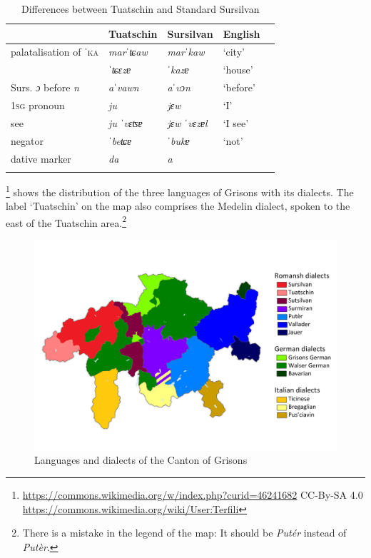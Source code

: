 \begin{table}
	\caption{Differences between Tuatschin and Standard Sursilvan}
	\label{difstand}
	\begin{tabular}{lllll}
		\lsptoprule
		& Tuatschin &  Sursilvan & English\\
		\midrule
	palatalisation of ˈ\textsc{ka}  & \textit{marˈʨaw} & \textit{marˈkaw} & `city'\\
	& \textit{ˈʨɛzɐ} & \textit{ˈkazɐ} & `house'\\
	Surs. \textit{ɔ} before \textit{n} & \textit{aˈvawn} & \textit{aˈvɔn} & `before'\\
	\textsc{1sg} pronoun & \textit{ju} & \textit{jɛw} & `I'\\
	see & \textit{ju ˈvɛʦɐ} & \textit{jɛw ˈvɛzɐl} & `I see'\\
	negator	& \textit{ˈbeʨɐ} &  \textit{ˈbukɐ} & `not'\\
	dative marker & \textit{da} &  \textit{a}\\
				\lspbottomrule
	\end{tabular}
\end{table}

\footnote{\tiny
	\url{https://commons.wikimedia.org/w/index.php?curid=46241682}
	CC-By-SA 4.0
	\url{https://commons.wikimedia.org/wiki/User:Terfili}
} shows the distribution of the three languages of Grisons with its dialects. The label `Tuatschin' on the map also comprises the Medelin dialect, spoken to the east of the Tuatschin area.\footnote{There is a mistake in the legend of the map: It should be \textit{Putér} instead of \textit{Putèr}.}

\begin{figure}
	\includegraphics[height=.5\textheight]{figures/Languages Grisons.png}
	\caption{Languages and dialects of the Canton of Grisons}
	\label{fig:surs}
\end{figure}


